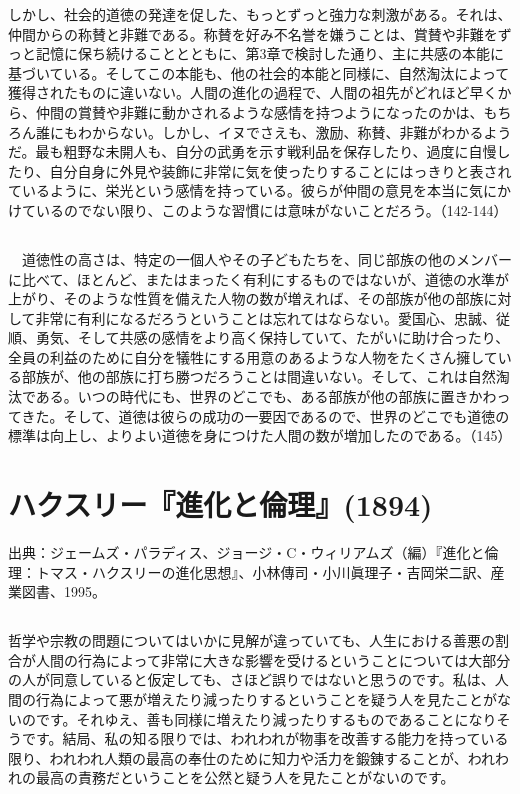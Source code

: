 しかし、社会的道徳の発達を促した、もっとずっと強力な刺激がある。それは、仲間からの称賛と非難である。称賛を好み不名誉を嫌うことは、賞賛や非難をずっと記憶に保ち続けることとともに、第3章で検討した通り、主に共感の本能に基づいている。そしてこの本能も、他の社会的本能と同様に、自然淘汰によって獲得されたものに違いない。人間の進化の過程で、人間の祖先がどれほど早くから、仲間の賞賛や非難に動かされるような感情を持つようになったのかは、もちろん誰にもわからない。しかし、イヌでさえも、激励、称賛、非難がわかるようだ。最も粗野な未開人も、自分の武勇を示す戦利品を保存したり、過度に自慢したり、自分自身に外見や装飾に非常に気を使ったりすることにはっきりと表されているように、栄光という感情を持っている。彼らが仲間の意見を本当に気にかけているのでない限り、このような習慣には意味がないことだろう。（142-144）

\subsection{}


　道徳性の高さは、特定の一個人やその子どもたちを、同じ部族の他のメンバーに比べて、ほとんど、またはまったく有利にするものではないが、道徳の水準が上がり、そのような性質を備えた人物の数が増えれば、その部族が他の部族に対して非常に有利になるだろうということは忘れてはならない。愛国心、忠誠、従順、勇気、そして共感の感情をより高く保持していて、たがいに助け合ったり、全員の利益のために自分を犠牲にする用意のあるような人物をたくさん擁している部族が、他の部族に打ち勝つだろうことは間違いない。そして、これは自然淘汰である。いつの時代にも、世界のどこでも、ある部族が他の部族に置きかわってきた。そして、道徳は彼らの成功の一要因であるので、世界のどこでも道徳の標準は向上し、よりよい道徳を身につけた人間の数が増加したのである。（145）

\newpage{}

\section{ハクスリー『進化と倫理』(1894)}

出典：ジェームズ・パラディス、ジョージ・C・ウィリアムズ（編）『進化と倫理：トマス・ハクスリーの進化思想』、小林傳司・小川眞理子・吉岡栄二訳、産業図書、1995。

\subsection{}



哲学や宗教の問題についてはいかに見解が違っていても、人生における善悪の割合が人間の行為によって非常に大きな影響を受けるということについては大部分の人が同意していると仮定しても、さほど誤りではないと思うのです。私は、人間の行為によって悪が増えたり減ったりするということを疑う人を見たことがないのです。それゆえ、善も同様に増えたり減ったりするものであることになりそうです。結局、私の知る限りでは、われわれが物事を改善する能力を持っている限り、われわれ人類の最高の奉仕のために知力や活力を鍛錬することが、われわれの最高の責務だということを公然と疑う人を見たことがないのです。


